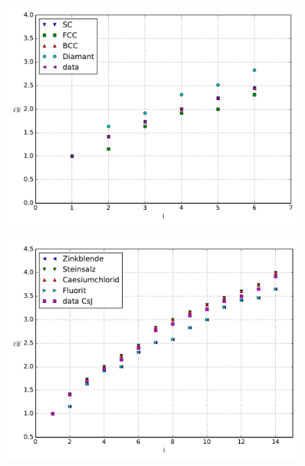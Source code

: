 \begin{figure}[h]
	\begin{minipage}[t]{0.45\textwidth}
		\includegraphics[width=\textwidth]{Abbildungen/verhaeltnisse.pdf}
		\label{fig:verhaeltnisse_metall}
	\end{minipage}
	\begin{minipage}[t]{0.45\textwidth}
		\includegraphics[width=\textwidth]{Abbildungen/verhaeltnisse_Salz.pdf}
		\label{fig:verhaeltnisse_salz}
\end{minipage}
\label{fig:verhaeltnisse}
\end{figure}
